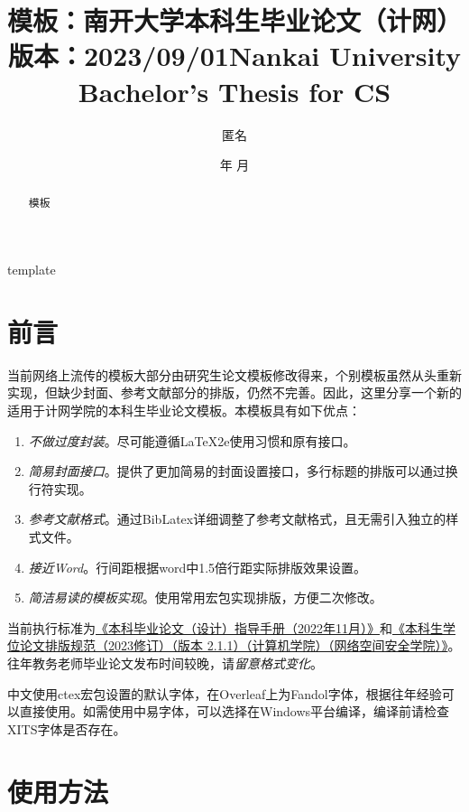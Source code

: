 \documentclass{nkuthesis}
\title{模板：南开大学本科生毕业论文（计网）\\ 版本：2023/09/01}
\title*{Nankai University Bachelor's Thesis for CS}
\author{匿名}
\date{\the\year 年 \the\month 月}
\begin{document}
\maketitle


\begin{abstract}
模板
\end{abstract}
\begin{abstract*}
template
\end{abstract*}

\tableofcontents


\section{前言}

当前网络上流传的模板大部分由研究生论文模板修改得来，个别模板虽然从头重新实现，但缺少封面、参考文献部分的排版，仍然不完善。因此，这里分享一个新的适用于计网学院的本科生毕业论文模板。本模板具有如下优点：

\begin{enumerate}
\item \emph{不做过度封装}。尽可能遵循LaTeX2e使用习惯和原有接口。
\item \emph{简易封面接口}。提供了更加简易的封面设置接口，多行标题的排版可以通过换行符实现。
\item \emph{参考文献格式}。通过BibLatex详细调整了参考文献格式，且无需引入独立的样式文件。
\item \emph{接近Word}。行间距根据word中1.5倍行距实际排版效果设置。
\item \emph{简洁易读的模板实现}。使用常用宏包实现排版，方便二次修改。
\end{enumerate}

当前执行标准为\href{http://jwc.nankai.edu.cn/2022/1124/c24a497818/page.htm}{《本科毕业论文（设计）指导手册（2022年11月）》}和\href{https://github.com/Tr0py/NKU-thesis-template-2020/files/11620969/2023V2.pdf}{《本科生学位论文排版规范（2023修订）（版本 2.1.1）（计算机学院）（网络空间安全学院）》}。往年教务老师毕业论文发布时间较晚，请\emph{留意格式变化}。

中文使用ctex宏包设置的默认字体，在Overleaf上为Fandol字体，根据往年经验可以直接使用。如需使用中易字体，可以选择在Windows平台编译，编译前请检查XITS字体是否存在。



\section{使用方法}\label{sec:usage}
\end{document}
